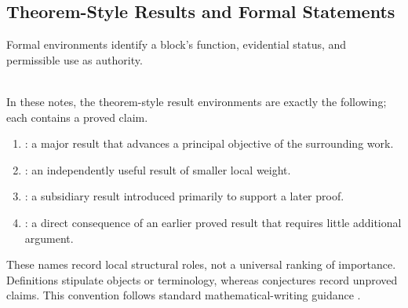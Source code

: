 \subsection{Theorem-Style Results and Formal Statements}

Formal environments identify a block's function, evidential status, and permissible use as authority.

\begin{convention} \label{conv:theorem-style-result-hierarchy} \\
In these notes, the theorem-style result environments are exactly the following; each contains a proved claim.
\begin{enumerate}[label=(\roman*)]
\setlength{\itemsep}{0pt}
\item {}: a major result that advances a principal objective of the surrounding work.
\item {}: an independently useful result of smaller local weight.
\item {}: a subsidiary result introduced primarily to support a later proof.
\item {}: a direct consequence of an earlier proved result that requires little additional argument.
\end{enumerate}
These names record local structural roles, not a universal ranking of importance. Definitions stipulate objects or terminology, whereas conjectures record unproved claims. This convention follows standard mathematical-writing guidance \citep{mit1998mathematicalwriting}.
\end{convention}

